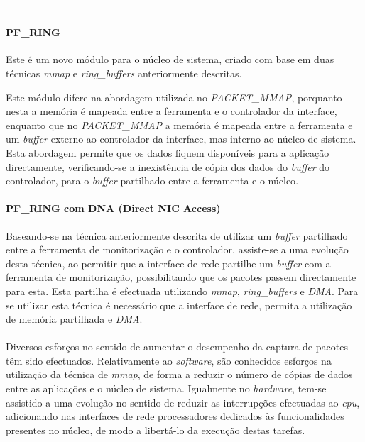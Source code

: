----------------------------------------------------------------------------------------------------------

\paragraph*{PF\_RING}

Este é um novo módulo para o núcleo de sistema, criado com base em duas técnicas \textit{mmap} e \textit{ring\_buffers} anteriormente descritas.

Este módulo difere na abordagem utilizada no \textit{PACKET\_MMAP}, porquanto nesta a memória é mapeada entre a ferramenta e o controlador da interface, enquanto que no \textit{PACKET\_MMAP} a memória é mapeada entre a ferramenta e um \textit{buffer} externo ao controlador da interface, mas interno ao núcleo de sistema.
Esta abordagem permite que os dados fiquem disponíveis para a aplicação directamente, verificando-se a inexistência de cópia dos dados do \textit{buffer} do controlador, para o \textit{buffer} partilhado entre a ferramenta e o núcleo\cite{PFRING}.
 
\paragraph*{PF\_RING com DNA (Direct NIC Access)}
Baseando-se na técnica anteriormente descrita de utilizar um \textit{buffer} partilhado entre a ferramenta de monitorização e o controlador, assiste-se a uma evolução desta técnica, ao permitir que a interface de rede partilhe um \textit{buffer} com a ferramenta de monitorização, possibilitando que os pacotes passem directamente para esta\cite{IntroPF_RIDNADirecNICAcces}.
Esta partilha é efectuada utilizando \textit{mmap}, \textit{ring\_buffers} e \textit{DMA}.
Para se utilizar esta técnica é necessário que a interface de rede, permita a utilização de memória partilhada e \textit{DMA}.

\paragraph*{}

Diversos esforços no sentido de aumentar o desempenho da captura de pacotes têm sido efectuados.
Relativamente ao \textit{software}, são conhecidos esforços na utilização da técnica de \textit{mmap}, de forma a reduzir o número de cópias de dados entre as aplicações e o núcleo de sistema.
Igualmente no \textit{hardware}, tem-se assistido a uma evolução no sentido de reduzir as interrupções efectuadas ao \textit{cpu}, adicionando nas interfaces de rede processadores dedicados às funcionalidades presentes no núcleo, de modo a libertá-lo da execução destas tarefas.


